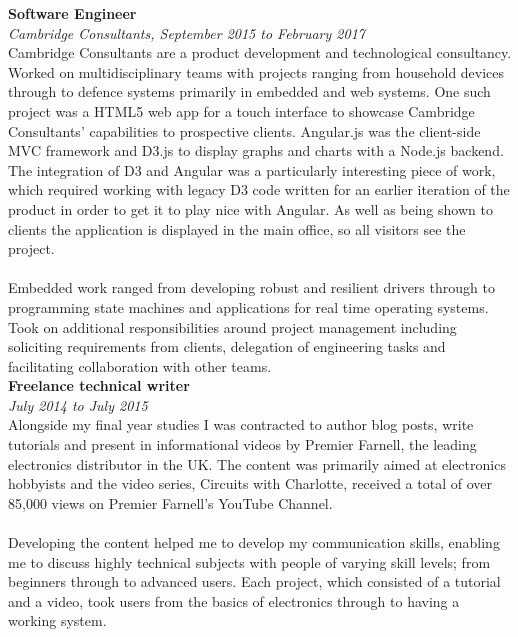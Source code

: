 \documentclass{article}
\begin{document}
\begin{flushleft}
\textbf{Software Engineer}\\
\textit{Cambridge Consultants, September 2015 to February 2017}\\[5pt]
Cambridge Consultants are a product development and technological consultancy. Worked on multidisciplinary teams with projects ranging from household devices through to defence systems primarily in embedded and web systems. One such project was a HTML5 web app for a touch interface to showcase Cambridge Consultants' capabilities to prospective clients. Angular.js was the client-side MVC framework and D3.js to display graphs and charts with a Node.js backend. The integration of D3 and Angular was a particularly interesting piece of work, which required working with legacy D3 code written for an earlier iteration of the product in order to get it to play nice with Angular. As well as being shown to clients the application is displayed in the main office, so all visitors see the project.

\paragraph{}Embedded work ranged from developing robust and resilient drivers through to programming state machines and applications for real time operating systems. Took on additional responsibilities around project management including soliciting requirements from clients, delegation of engineering tasks and facilitating collaboration with other teams.\\[10pt]

\textbf{Freelance technical writer}\\
\textit{July 2014 to July 2015}\\[5pt]
Alongside my final year studies I was contracted to author blog posts, write tutorials and present in informational videos by Premier Farnell, the leading electronics distributor in the UK. The content was primarily aimed at electronics hobbyists and the video series, Circuits with Charlotte, received a total of over 85,000 views on Premier Farnell's YouTube Channel.

\paragraph{}Developing the content helped me to develop my communication skills, enabling me to discuss highly technical subjects with people of varying skill levels; from beginners through to advanced users. Each project, which consisted of a tutorial and a video, took users from the basics of electronics through to having a working system.


\end{flushleft}
\end{document}
